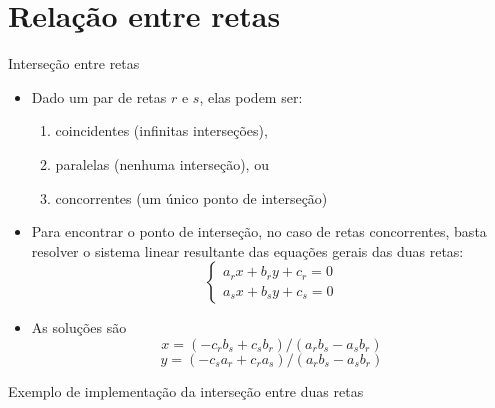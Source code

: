 \section{Relação entre retas}

\begin{frame}[fragile]{Interseção entre retas}

    \begin{itemize}
        \item Dado um par de retas $r$ e $s$, elas podem ser:

        \begin{enumerate}
            \item coincidentes (infinitas interseções),
            \item paralelas (nenhuma interseção), ou
            \item concorrentes (um único ponto de interseção)
        \end{enumerate}

        \item Para encontrar o ponto de interseção, no caso de retas concorrentes, basta resolver o sistema linear resultante das equações gerais das duas retas:
        \[
            \left\lbrace \begin{array}{l} a_rx + b_ry + c_r = 0 \\ a_sx + b_sy + c_s = 0
            \end{array} \right.
        \]

        \item As soluções são
        \[
            x = (-c_r b_s + c_s b_r) / (a_rb_s - a_sb_r)
        \]
        \[
            y = (-c_sa_r + c_ra_s) / (a_rb_s - a_sb_r)
        \]

    \end{itemize}

\end{frame}

\begin{frame}[fragile]{Exemplo de implementação da interseção entre duas retas}
\end{frame}

